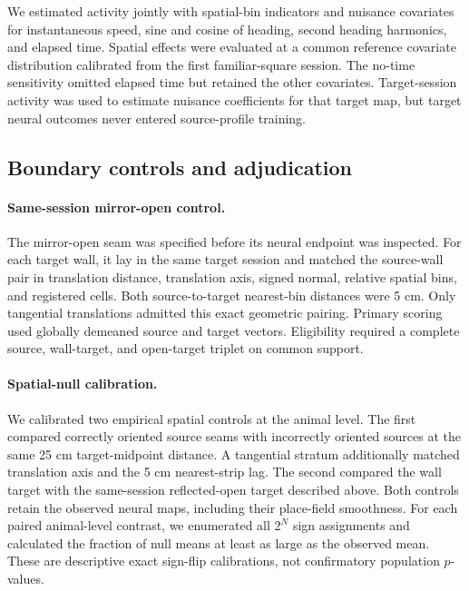 \documentclass[10pt,twocolumn]{article}
\begin{document}
We estimated activity jointly with spatial-bin indicators and nuisance
covariates for instantaneous speed, sine and cosine of heading, second heading
harmonics, and elapsed time. Spatial effects were evaluated at a common
reference covariate distribution calibrated from the first familiar-square
session. The no-time sensitivity omitted elapsed time but retained the other
covariates. Target-session activity was used to estimate nuisance coefficients
for that target map, but target neural outcomes never entered source-profile
training.

\subsection{Boundary controls and adjudication}

\paragraph{Same-session mirror-open control.}

The mirror-open seam was specified before its neural endpoint was inspected.
For each target wall, it lay in the same target session and matched
the source-wall pair in translation distance, translation axis, signed normal,
relative spatial bins, and registered cells. Both source-to-target nearest-bin
distances were 5 cm. Only tangential translations admitted this exact
geometric pairing. Primary scoring used globally demeaned source and target
vectors. Eligibility required a complete source, wall-target, and open-target
triplet on common support.

\paragraph{Spatial-null calibration.}

We calibrated two empirical spatial controls at the animal level. The first
compared correctly oriented source seams with incorrectly oriented sources at
the same 25 cm target-midpoint distance. A tangential stratum additionally
matched translation axis and the 5 cm nearest-strip lag. The second compared
the wall target with the same-session reflected-open target described above.
Both controls retain the observed neural maps, including their place-field
smoothness. For each paired animal-level contrast, we enumerated all \(2^N\)
sign assignments and calculated the fraction of null means at least as large
as the observed mean. These are descriptive exact sign-flip calibrations, not
confirmatory population \(p\)-values.
\end{document}
